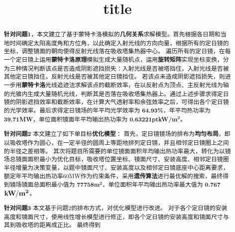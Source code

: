 \documentclass{myclass}
\title{title}
\begin{document}
\begin{abstract}
\textbf{针对问题1}，本文建立了基于蒙特卡洛模拟的\textbf{几何关系}求解模型。首先根据各日期和当地时间确定太阳高度角和方位角，以此确定入射光线的方向向量，根据所有的定日镜的坐标，调整镜面的朝向使得反射光线落在吸收塔集热器中心。
遍历所有的定日镜，在每一个定日镜上运用\textbf{蒙特卡洛原理}模拟生成大量随机点，运用\textbf{旋转矩阵}实现坐标变换，分为三种情况判断该点是否造成阴影遮挡损失：入射光线是否被塔挡住，入射光线是否被其他定日镜挡住，反射光线是否被其他定日镜挡住。
若该点未造成阴影遮挡损失，则进一步用\textbf{蒙特卡洛}光线追迹法求解该点的截断效率，在以反射点为顶点、主反射光线为轴的光锥内生成大量随机光线，判断其是否落在吸收塔集热器上。通过上述步骤求得定日镜的阴影遮挡效率和截断效率，在计算大气透射率和余弦效率之后，可得出各个定日镜的光学效率。最后求得定日镜场的年平均光学效率为 \textbf{64.93\%}，年平均热功率为 \textbf{39.71MW}，单位面积镜面年平均输出热功率为 \textbf{0.6322\kern 1ptkW\kern -1pt/m}\({}^{\mathbf{2}}\)。

\textbf{针对问题2} 本文建立了如下单目标\textbf{优化模型}：
首先，定日镜镜场的排布为\textbf{均匀布局}，即以吸收塔作为圆心，在一定半径的圆周上等距地排列定日镜，并且相邻定日镜圈上之间的半径之差相等。
其次将题目所需要的单位镜面面积年均输出热功率最大，转化为以镜场总镜面面积最小为优化目标，吸收塔位置坐标、镜面尺寸、安装高度、相邻定日镜圈半径增量为决策变量，以题中镜面尺寸、安装高度以及相邻定日镜底座中心距离要求，额定年平均输出热功率60MW作为约束条件，采用\textbf{遗传算法}进行最优解的搜索，最终得到镜场镜面总面积最小值为 \textbf{77758}\(\mathbf{m}^{\mathbf{2}}\)，单位面积年平均输出热功率最大值为
\textbf{0.767}\kern -1pt\(\mathbf{kW\kern -1pt/m^{2}}\)。

\textbf{针对问题3} 本文基于问题2的排布方式，对优化模型进行改进。
对于各个定日镜的安装高度和镜面尺寸，使用线性增长模型进行修正，即各个定日镜的安装高度和镜面尺寸与其到吸收塔的距离成正比。
最终得到
\end{abstract}









\end{document}
